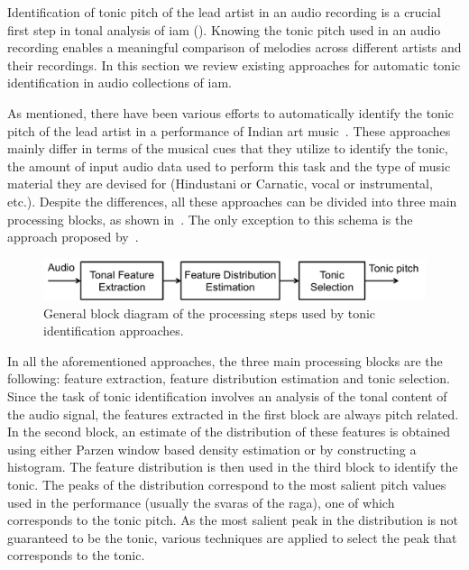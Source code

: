 Identification of tonic pitch of the lead artist in an audio recording is a crucial first step in tonal analysis of \gls{iam} (). Knowing the tonic pitch used in an audio recording enables a meaningful comparison of melodies across different artists and their recordings. In this section we review existing approaches for automatic tonic identification in audio collections of \gls{iam}. 

As mentioned, there have been various efforts to automatically identify the tonic pitch of the lead artist in a performance of Indian art music~\citep{salamon2012multipitch,gulati2012two,bellur2012knowledge,ranjani2011carnatic,Sengupta2005b}. These approaches mainly differ in terms of the musical cues that they utilize to identify the tonic, the amount of input audio data used to perform this task and the type of music material they are devised for (Hindustani or Carnatic, vocal or
instrumental, etc.). Despite the differences, all these approaches can be divided into three main processing blocks, as shown in~. The only exception to this schema is the approach proposed by~\cite{Sengupta2005b}.

\begin{figure}
	\begin{center}
		\includegraphics[width=\figSizeNinety]{ch02_background/figures/tonic_identification_block_diagram.pdf}
	\end{center}
	\caption[General block diagram of the processing steps used by tonic identification
	approaches.]{General block diagram of the processing steps used by tonic identification
		approaches.}
	\label{fig:tonic_identification_general_block_diagram}
\end{figure}


In all the aforementioned approaches, the three main processing blocks are the following: feature extraction, feature distribution estimation and tonic selection. Since the task of tonic identification involves an analysis of the tonal content of the audio signal, the features extracted in the first block are always pitch related. In the second block, an estimate of the distribution of these features is obtained using either Parzen window based density estimation or by constructing a histogram. The feature distribution is then used in the third block to identify the tonic. The peaks of the distribution correspond to the most salient pitch values used in the performance (usually the \glspl{svara} of the \gls{raga}), one of which corresponds to the tonic pitch. As the most salient peak in the distribution is not guaranteed to be the tonic, various techniques are applied to select the peak that corresponds to the tonic.

